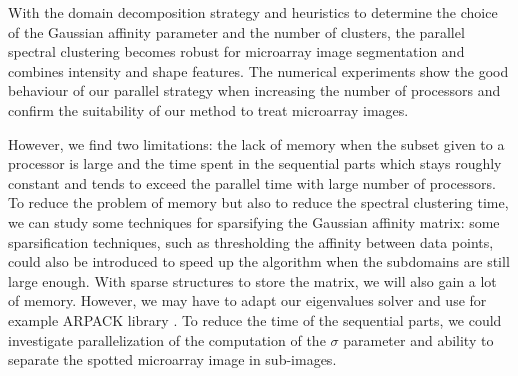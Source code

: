 \documentclass[]{svmult}
\begin{document}
With the domain decomposition strategy and heuristics to determine the
choice of the Gaussian affinity parameter and the number of clusters, the
parallel spectral clustering becomes robust for microarray image segmentation
and combines intensity and shape features. The numerical experiments show the good behaviour of our parallel strategy
when increasing the number of processors and confirm the suitability of our
method to treat microarray images. 

However, we find two limitations: the lack of memory when the subset given to
a processor is large and the time spent in the sequential parts which stays
roughly constant and tends to exceed the parallel time with large number of
processors. 
To reduce the problem of memory but also to reduce the spectral clustering
time, we can study some techniques for sparsifying the Gaussian affinity
matrix: some sparsification techniques, such as thresholding the affinity
between data points, could also be introduced to speed up the algorithm when
the subdomains are still large enough. With sparse structures to store the
matrix, we will also gain a lot of memory.  However, we may have to adapt our
eigenvalues solver and use for example ARPACK library
\cite{lehoucq1998arpack}.
To reduce the time of the sequential parts, we could investigate parallelization of the
computation of the $\sigma$ parameter and ability to separate the spotted
microarray image in sub-images. 
\vspace{-0.8cm}
\small{


}
\end{document}
